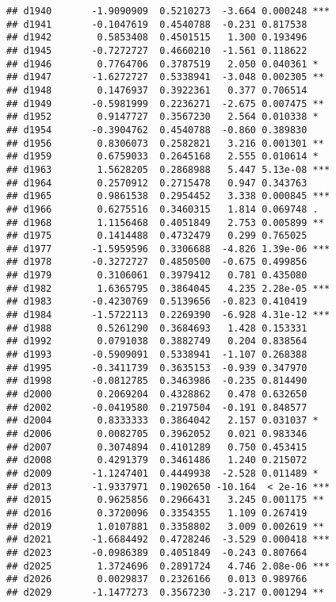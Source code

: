 \documentclass[
]{article}
\begin{document}
\begin{verbatim}
## d1940       -1.9090909  0.5210273  -3.664 0.000248 ***
## d1941       -0.1047619  0.4540788  -0.231 0.817538    
## d1942        0.5853408  0.4501515   1.300 0.193496    
## d1945       -0.7272727  0.4660210  -1.561 0.118622    
## d1946        0.7764706  0.3787519   2.050 0.040361 *  
## d1947       -1.6272727  0.5338941  -3.048 0.002305 ** 
## d1948        0.1476937  0.3922361   0.377 0.706514    
## d1949       -0.5981999  0.2236271  -2.675 0.007475 ** 
## d1952        0.9147727  0.3567230   2.564 0.010338 *  
## d1954       -0.3904762  0.4540788  -0.860 0.389830    
## d1956        0.8306073  0.2582821   3.216 0.001301 ** 
## d1959        0.6759033  0.2645168   2.555 0.010614 *  
## d1963        1.5628205  0.2868988   5.447 5.13e-08 ***
## d1964        0.2570912  0.2715478   0.947 0.343763    
## d1965        0.9861538  0.2954452   3.338 0.000845 ***
## d1966        0.6275516  0.3460315   1.814 0.069748 .  
## d1968        1.1156468  0.4051849   2.753 0.005899 ** 
## d1975        0.1414488  0.4732479   0.299 0.765025    
## d1977       -1.5959596  0.3306688  -4.826 1.39e-06 ***
## d1978       -0.3272727  0.4850500  -0.675 0.499856    
## d1979        0.3106061  0.3979412   0.781 0.435080    
## d1982        1.6365795  0.3864045   4.235 2.28e-05 ***
## d1983       -0.4230769  0.5139656  -0.823 0.410419    
## d1984       -1.5722113  0.2269390  -6.928 4.31e-12 ***
## d1988        0.5261290  0.3684693   1.428 0.153331    
## d1992        0.0791038  0.3882749   0.204 0.838564    
## d1993       -0.5909091  0.5338941  -1.107 0.268388    
## d1995       -0.3411739  0.3635153  -0.939 0.347970    
## d1998       -0.0812785  0.3463986  -0.235 0.814490    
## d2000        0.2069204  0.4328862   0.478 0.632650    
## d2002       -0.0419580  0.2197504  -0.191 0.848577    
## d2004        0.8333333  0.3864042   2.157 0.031037 *  
## d2006        0.0082705  0.3962052   0.021 0.983346    
## d2007        0.3074894  0.4101289   0.750 0.453415    
## d2008        0.4291379  0.3461486   1.240 0.215072    
## d2009       -1.1247401  0.4449938  -2.528 0.011489 *  
## d2013       -1.9337971  0.1902650 -10.164  < 2e-16 ***
## d2015        0.9625856  0.2966431   3.245 0.001175 ** 
## d2016        0.3720096  0.3354355   1.109 0.267419    
## d2019        1.0107881  0.3358802   3.009 0.002619 ** 
## d2021       -1.6684492  0.4728246  -3.529 0.000418 ***
## d2023       -0.0986389  0.4051849  -0.243 0.807664    
## d2025        1.3724696  0.2891724   4.746 2.08e-06 ***
## d2026        0.0029837  0.2326166   0.013 0.989766    
## d2029       -1.1477273  0.3567230  -3.217 0.001294 ** 

\end{verbatim}
\end{document}
